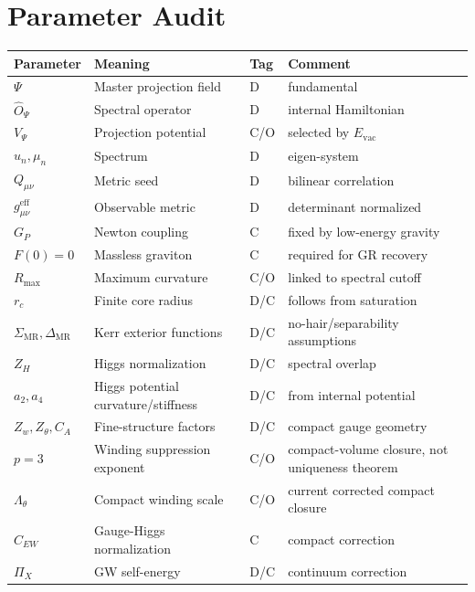 \documentclass[11pt]{article}
\newcommand{\MR}{\mathrm{MR}}
\newcommand{\eff}{\mathrm{eff}}
\newcommand{\vac}{\mathrm{vac}}
\begin{document}
\section{Parameter Audit}
\begin{longtable}{>{\raggedright\arraybackslash}p{} >{\raggedright\arraybackslash}p{} >{\centering\arraybackslash}p{} >{\raggedright\arraybackslash}p{}}
\toprule
\textbf{Parameter} & \textbf{Meaning} & \textbf{Tag} & \textbf{Comment} \\
\midrule
\endhead
$\Psi$ & Master projection field & D & fundamental \\
$\hat O_\Psi$ & Spectral operator & D & internal Hamiltonian \\
$V_\Psi$ & Projection potential & C/O & selected by $E_{\vac}$ \\
$u_n,\mu_n$ & Spectrum & D & eigen-system \\
$Q_{\mu\nu}$ & Metric seed & D & bilinear correlation \\
$g_{\mu\nu}^{\eff}$ & Observable metric & D & determinant normalized \\
$G_P$ & Newton coupling & C & fixed by low-energy gravity \\
$F(0)=0$ & Massless graviton & C & required for GR recovery \\
$R_{\max}$ & Maximum curvature & C/O & linked to spectral cutoff \\
$r_c$ & Finite core radius & D/C & follows from saturation \\
$\Sigma_{\MR},\Delta_{\MR}$ & Kerr exterior functions & D/C & no-hair/separability assumptions \\
$Z_H$ & Higgs normalization & D/C & spectral overlap \\
$a_2,a_4$ & Higgs potential curvature/stiffness & D/C & from internal potential \\
$Z_w,Z_\theta,C_A$ & Fine-structure factors & D/C & compact gauge geometry \\
$p=3$ & Winding suppression exponent & C/O & compact-volume closure, not uniqueness theorem \\
$\Lambda_\theta$ & Compact winding scale & C/O & current corrected compact closure \\
$C_{EW}$ & Gauge-Higgs normalization & C & compact correction \\
$\Pi_X$ & GW self-energy & D/C & continuum correction \\
\bottomrule
\end{longtable}
\end{document}
